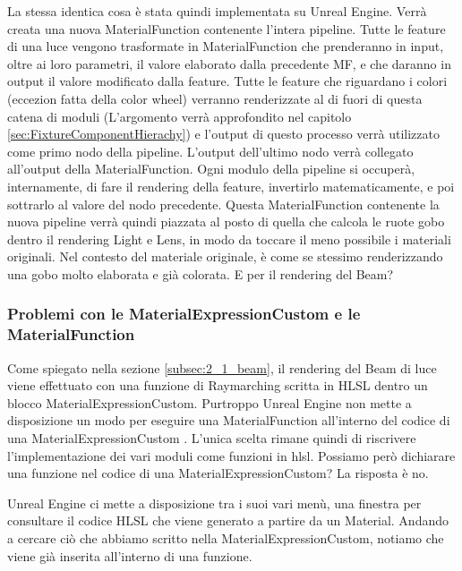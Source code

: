 \documentclass[main.tex]{subfiles}
\begin{document}
La stessa identica cosa è stata quindi implementata su Unreal Engine. Verrà creata una nuova MaterialFunction contenente l'intera pipeline. Tutte le feature di una luce vengono trasformate in MaterialFunction che prenderanno in input, oltre ai loro parametri, il valore elaborato dalla precedente MF, e che daranno in output il valore modificato dalla feature. Tutte le feature che riguardano i colori (eccezion fatta della color wheel) verranno renderizzate al di fuori di questa catena di moduli (L'argomento verrà approfondito nel capitolo \ref{sec:FixtureComponentHierachy}) e l'output di questo processo verrà utilizzato come primo nodo della pipeline. L'output dell'ultimo nodo verrà collegato all'output della MaterialFunction. Ogni modulo della pipeline si occuperà, internamente, di fare il rendering della feature, invertirlo matematicamente, e poi sottrarlo al valore del nodo precedente. \newline
Questa MaterialFunction contenente la nuova pipeline verrà quindi piazzata al posto di quella che calcola le ruote gobo dentro il rendering Light e Lens, in modo da toccare il meno possibile i materiali originali. Nel contesto del materiale originale, è come se stessimo renderizzando una gobo molto elaborata e già colorata. \newline
E per il rendering del Beam?

\subsubsection{Problemi con le MaterialExpressionCustom e le MaterialFunction}\label{subsec:2_2_CM-MFproblems}
Come spiegato nella sezione \ref{subsec:2_1_beam}, il rendering del Beam di luce viene effettuato con una funzione di Raymarching scritta in HLSL dentro un blocco MaterialExpressionCustom. Purtroppo Unreal Engine non mette a disposizione un modo  per eseguire una MaterialFunction all'interno del codice di una MaterialExpressionCustom \cite{customExpressionMaterialFunction}. L'unica scelta rimane quindi di riscrivere l'implementazione dei vari moduli come funzioni in hlsl. Possiamo però dichiarare una funzione nel codice di una MaterialExpressionCustom? La risposta è no.

Unreal Engine ci mette a disposizione tra i suoi vari menù, una finestra per consultare il codice HLSL che viene generato a partire da un Material. Andando a cercare ciò che abbiamo scritto nella MaterialExpressionCustom, notiamo che viene già inserita all'interno di una funzione.
\end{document}
